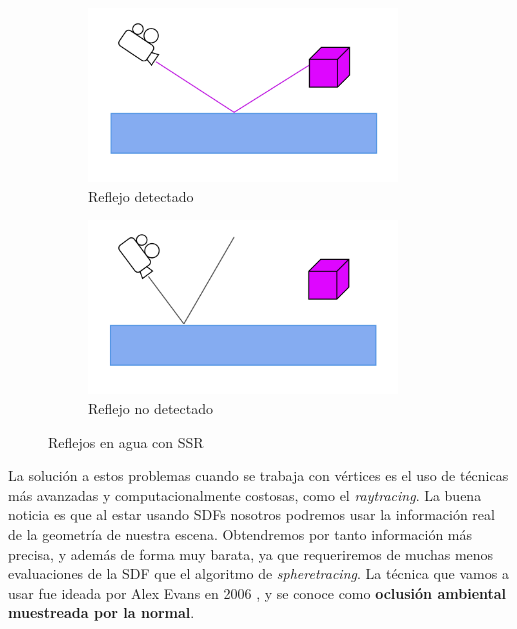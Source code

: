 \begin{figure}[!h]
     \begin{subfigure}[b]{0.49\linewidth}
        \centering
        \includegraphics[width=0.9\textwidth]{Plantilla-TFG-master/img/ssr2.png}
        \caption{Reflejo detectado}
     \end{subfigure}
     \begin{subfigure}[b]{0.49\linewidth}
        \centering
        \includegraphics[width=0.9\textwidth]{Plantilla-TFG-master/img/ssr3.png}
        \caption{Reflejo no detectado}
     \end{subfigure}
     \caption{Reflejos en agua con SSR}
     \label{fig:ssrEsquema}
\end{figure}

La solución a estos problemas cuando se trabaja con vértices es el uso de técnicas más avanzadas y computacionalmente costosas, como el \textit{raytracing}. La buena noticia es que al estar usando SDFs nosotros podremos usar la información real de la geometría de nuestra escena. Obtendremos por tanto información más precisa, y además de forma muy barata, ya que requeriremos de muchas menos evaluaciones de la SDF que el algoritmo de \textit{spheretracing}. La técnica que vamos a usar fue ideada por Alex Evans en 2006 \cite{ao}, y se conoce como \textbf{oclusión ambiental muestreada por la normal}.\newline

